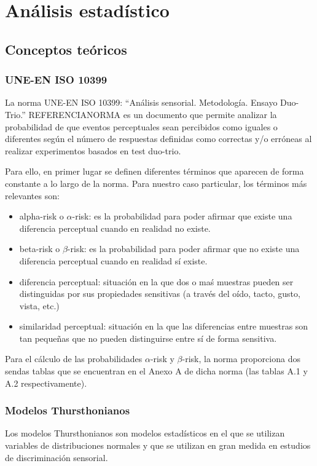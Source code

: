 \documentclass[11pt,a4paper,twoside]{book}
\author{Víctor de Tejada Molera}
\begin{document}
\chapter{Análisis estadístico}    
    \section{Conceptos teóricos}    
        \subsection*{UNE-EN ISO 10399}
            La norma UNE-EN ISO 10399: ``Análisis sensorial. Metodología. Ensayo Duo-Trio.'' REFERENCIANORMA es un documento que permite analizar la probabilidad de que eventos perceptuales sean percibidos como iguales o diferentes según el número de respuestas definidas como correctas y/o erróneas al realizar experimentos basados en test duo-trio.
        
            Para ello, en primer lugar se definen diferentes términos que aparecen de forma constante a lo largo de la norma. Para nuestro caso particular, los términos más relevantes son:
        
            \begin{itemize}
                \item alpha-risk o $\alpha$-risk: es la probabilidad para poder afirmar que existe una diferencia perceptual cuando en realidad no existe.
                \item beta-risk o $\beta$-risk: es la probabilidad para poder afirmar que no existe una diferencia perceptual cuando en realidad sí existe.
                \item diferencia perceptual: situación en la que dos o maś muestras pueden ser distinguidas por sus propiedades sensitivas (a través del oído, tacto, gusto, vista, etc.)
                \item similaridad perceptual: situación en la que las diferencias entre muestras son tan pequeñas que no pueden distinguirse entre sí de forma sensitiva.
            \end{itemize}
            Para el cálculo de las probabilidades $\alpha$-risk y $\beta$-risk, la norma proporciona dos sendas tablas que se encuentran en el Anexo A de dicha norma (las tablas A.1 y A.2 respectivamente).
        \subsection*{Modelos Thursthonianos}
            Los modelos Thursthonianos son modelos estadísticos en el que se utilizan variables de distribuciones normales y que se utilizan en gran medida en estudios de discriminación sensorial. 
            
\end{document}
